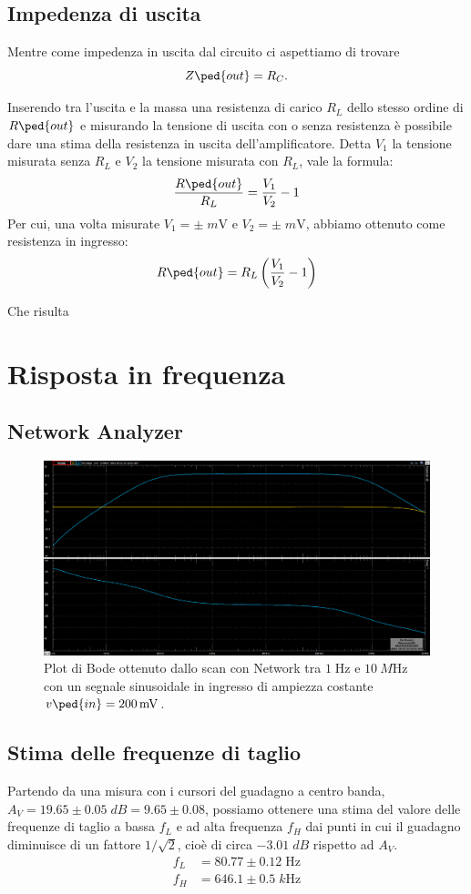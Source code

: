 \documentclass[10pt,a4paper]{article}
\begin{document}
\subsection{Impedenza di uscita}
Mentre come impedenza in uscita dal circuito ci aspettiamo di trovare
\[
Z\ped{out} = R_C
.\]

Inserendo tra l'uscita e la massa una resistenza di carico $R_L$ dello stesso
ordine di $R\ped{out}$ e misurando la tensione di uscita con o senza
resistenza è possibile dare una stima della resistenza in uscita
dell'amplificatore.
Detta $V_1$ la tensione misurata senza $R_L$ e $V_2$ la tensione misurata
con $R_L$, vale la formula:
\begin{equation}\label{eq: Zout}
\frac{R\ped{out}}{R_L} = \frac{V_1}{V_2} -1
\end{equation}
Per cui, una volta misurate $V_1 = \pm \; \si{m\V}$ e
$V_2 = \pm \; \si{m\V}$, abbiamo ottenuto come resistenza in ingresso:
\[
R\ped{out} = R_L \left(\frac{V_1}{V_2} - 1\right)
\]

Che risulta
\section{Risposta in frequenza}

\subsection{Network Analyzer}
\begin{figure}[htb]
\centering
\includegraphics[scale=0.35]{1-10Mnet}
\caption{Plot di Bode ottenuto dallo scan con Network tra $1 \; \si{\Hz}$ e
$\SI{10}{M\Hz}$ con un segnale sinusoidale in ingresso di ampiezza costante
$v\ped{in} = \SI{200}{m\V}$. \label{fig: bodeplot}}
\end{figure}

\subsection{Stima delle frequenze di taglio}
Partendo da una misura con i cursori del guadagno a centro banda,
$A_V = 19.65 \pm 0.05 \; \si{dB} = 9.65 \pm 0.08$, possiamo ottenere una stima del valore
delle frequenze di taglio a bassa $f_L$ e ad alta frequenza $f_H$ dai punti
in cui il guadagno diminuisce di un fattore $1/\sqrt{2}$, cioè di circa
$-3.01 \; \si{dB}$ rispetto ad $A_V$.
\begin{align*}
f_L &= 80.77 \pm 0.12 \; \si{\Hz}\\
f_H &= 646.1 \pm 0.5 \; \si{k\Hz}
\end{align*}
\end{document}
